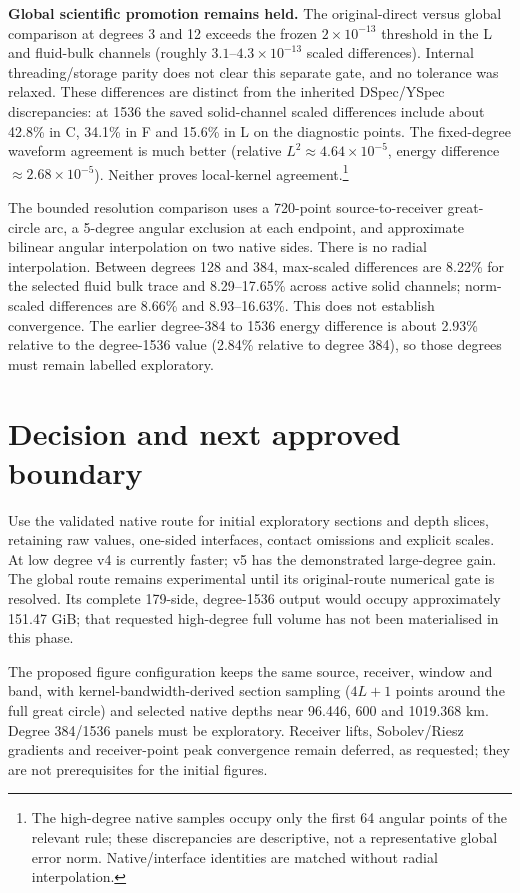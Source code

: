 \documentclass[11pt,a4paper]{article}
\begin{document}
\textbf{Global scientific promotion remains held.} The original-direct versus global comparison at degrees 3 and 12 exceeds the frozen $2\times10^{-13}$ threshold in the L and fluid-bulk channels (roughly $3.1$--$4.3\times10^{-13}$ scaled differences). Internal threading/storage parity does not clear this separate gate, and no tolerance was relaxed. These differences are distinct from the inherited DSpec/YSpec discrepancies: at 1536 the saved solid-channel scaled differences include about 42.8\% in C, 34.1\% in F and 15.6\% in L on the diagnostic points. The fixed-degree waveform agreement is much better (relative $L^2\approx4.64\times10^{-5}$, energy difference $\approx2.68\times10^{-5}$). Neither proves local-kernel agreement.\footnote{The high-degree native samples occupy only the first 64 angular points of the relevant rule; these discrepancies are descriptive, not a representative global error norm. Native/interface identities are matched without radial interpolation.}

The bounded resolution comparison uses a 720-point source-to-receiver great-circle arc, a 5-degree angular exclusion at each endpoint, and approximate bilinear angular interpolation on two native sides. There is no radial interpolation. Between degrees 128 and 384, max-scaled differences are 8.22\% for the selected fluid bulk trace and 8.29--17.65\% across active solid channels; norm-scaled differences are 8.66\% and 8.93--16.63\%. This does not establish convergence. The earlier degree-384 to 1536 energy difference is about 2.93\% relative to the degree-1536 value (2.84\% relative to degree 384), so those degrees must remain labelled exploratory.
\section{Decision and next approved boundary}
Use the validated native route for initial exploratory sections and depth slices, retaining raw values, one-sided interfaces, contact omissions and explicit scales. At low degree v4 is currently faster; v5 has the demonstrated large-degree gain. The global route remains experimental until its original-route numerical gate is resolved. Its complete 179-side, degree-1536 output would occupy approximately 151.47 GiB; that requested high-degree full volume has not been materialised in this phase.

The proposed figure configuration keeps the same source, receiver, window and band, with kernel-bandwidth-derived section sampling ($4L+1$ points around the full great circle) and selected native depths near 96.446, 600 and 1019.368 km. Degree 384/1536 panels must be exploratory. Receiver lifts, Sobolev/Riesz gradients and receiver-point peak convergence remain deferred, as requested; they are not prerequisites for the initial figures.
\end{document}

